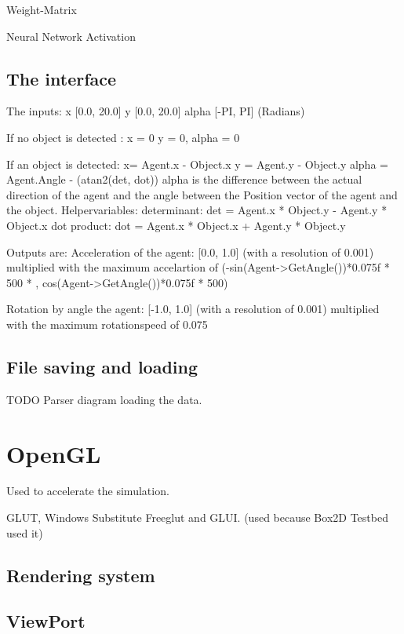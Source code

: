 \documentclass[10pt,a4paper,DIV=11]{scrreprt}
\begin{document}
Weight-Matrix

Neural Network Activation

\subsection{The interface}


The inputs: 
x  [0.0, 20.0]
y   [0.0, 20.0]
alpha  [-PI, PI] (Radians)

If no object is detected :
x = 0
y = 0,
alpha = 0 

If an object is detected:
x= Agent.x - Object.x  
y = Agent.y - Object.y
alpha = Agent.Angle - (atan2(det, dot)) 
alpha is the difference between the actual direction of the agent and
the angle between the Position vector of the agent and the object. 
Helpervariables:
determinant: det =  Agent.x * Object.y - Agent.y * Object.x 
dot product:  dot =  Agent.x * Object.x + Agent.y * Object.y 


Outputs are:
Acceleration of the agent: [0.0, 1.0] (with a resolution of 0.001)
multiplied with the maximum accelartion of 
(-sin(Agent->GetAngle())*0.075f * 500 * ,  cos(Agent->GetAngle())*0.075f * 500)

Rotation by angle the agent: [-1.0, 1.0] (with a resolution of 0.001)
multiplied with the maximum rotationspeed of 0.075


\subsection{File saving and loading}

TODO Parser diagram loading the data.


\section{OpenGL}
Used to accelerate the simulation.


GLUT, Windows Substitute Freeglut and GLUI. (used because Box2D Testbed used it)

\subsection{Rendering system}

\subsection{ViewPort}
\end{document}
